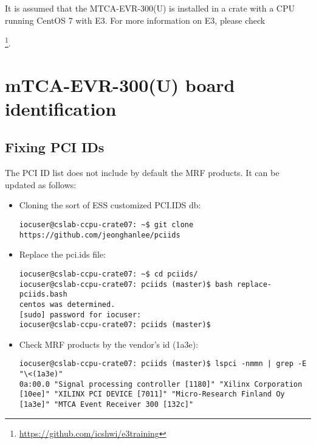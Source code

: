\documentclass[11pt
  , a4paper
  , article
  , oneside
  , showtrims
]{memoir}
\begin{document}
It is assumed that the MTCA-EVR-300(U) is installed in a crate with a CPU running CentOS 7 with E3. For more information on E3, please check {\footnote{\url{https://github.com/icshwi/e3training}}.\\


\section{mTCA-EVR-300(U) board identification}

\subsection{Fixing PCI IDs}
The PCI ID list does not include by default the MRF products. It can be updated as follows:
\begin{itemize}
\item Cloning the sort of ESS customized PCI.IDS db:
\begin{lstlisting}[style=termstyle]
iocuser@cslab-ccpu-crate07: ~$ git clone https://github.com/jeonghanlee/pciids
\end{lstlisting}
\item Replace the pci.ids file:
\begin{lstlisting}[style=termstyle]
iocuser@cslab-ccpu-crate07: ~$ cd pciids/
iocuser@cslab-ccpu-crate07: pciids (master)$ bash replace-pciids.bash
centos was determined.
[sudo] password for iocuser:
iocuser@cslab-ccpu-crate07: pciids (master)$
\end{lstlisting}
\item Check MRF products by the vendor's id (1a3e):
\begin{lstlisting}[style=termstyle]
iocuser@cslab-ccpu-crate07: pciids (master)$ lspci -nmmn | grep -E "\<(1a3e)"
0a:00.0 "Signal processing controller [1180]" "Xilinx Corporation [10ee]" "XILINX PCI DEVICE [7011]" "Micro-Research Finland Oy [1a3e]" "MTCA Event Receiver 300 [132c]"
\end{lstlisting}
\end{itemize}

}
\end{document}
